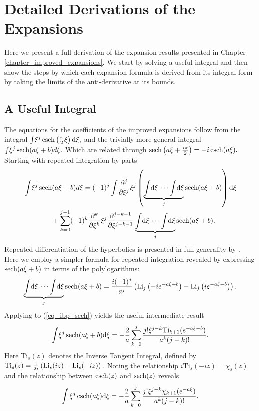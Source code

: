\section{Detailed Derivations of the Expansions}
\label{appendix_expansions_detail}
Here we present a full derivation of the expansion results
presented in Chapter
\ref{chapter_improved_expansions}.  We start by solving a useful
integral and then show the steps by which each expansion formula
is derived from its integral form by taking the limits of the
anti-derivative at its bounds.

\subsection{A Useful Integral}
The equations
for the coefficients of the improved
expansions follow from the integral
$
\int \!
\xi^j\operatorname{csch}\left(\frac{\pi}{2}\xi\right)
\mathrm{d}\xi,
$
and the trivially more general integral
$
\int \! \xi^j \operatorname{sech}(a \xi + b) d\xi.
$
Which are related through
$
\operatorname{sech}\left(a\xi + \frac{i \pi}{2}\right) = -i \operatorname{csch}(a\xi).
$
Starting with repeated integration by parts
\begin{align}
	\begin{split}
		&\int \! \xi^j \operatorname{sech}(a\xi + b) d\xi =
		(-1)^j \int \! \frac{\partial^j}{\partial \xi^j} \xi^j \left(
		\underbrace{\int \! \mathrm{d\xi} \, \cdots \int \! \mathrm{d\xi}}_{j}
		\operatorname{sech}(a\xi + b) \right) \mathrm{d}\xi \\
		&\quad\quad\quad\quad + \sum_{k=0}^{j-1} (-1)^k \frac{\partial^k}{\partial \xi^k}\xi^{j}
		\frac{\partial^{j-k-1}}{\partial\xi^{j-k-1}}
		\underbrace{\int \! \mathrm{d\xi} \, \cdots \int \! \mathrm{d\xi}}_{j}
		\operatorname{sech}(a\xi + b).
		\label{eq_ibp_sech}
	\end{split}
\end{align}
Repeated differentiation of the hyperbolics is presented
in full generality by \cite{qureshi_successive_2019}.  Here we
employ a simpler formula for repeated integration revealed by
expressing $\operatorname{sech}(a\xi + b)$ in terms of the polylogarithms:
\begin{align}
	\underbrace{\int \! \mathrm{d\xi} \, \cdots \int \! \mathrm{d\xi}}_{j}
	\operatorname{sech}(a\xi + b) =
	\frac{i (-1)^j}{a^j}\left(
	\operatorname{Li}_j\left(-i e^{-a\xi + b}\right)
	- \operatorname{Li}_j\left(i e^{-a\xi - b}\right)
	\right).
\end{align}
Applying to (\ref{eq_ibp_sech}) yields
the useful intermediate result
\begin{align}
	\int \! \xi^j \operatorname{sech}(a\xi + b) \mathrm{d}\xi =
	-\frac{2}{a} \sum_{k=0}^j \frac{j! \xi^{j-k}
		\mathrm{Ti}_{k+1}(e^{-a\xi -b})}{a^k (j-k)!}.
\end{align}
Here $\mathrm{Ti}_s(z)$ denotes the Inverse Tangent Integral, defined by
\mbox{$
	\mathrm{Ti}_s(z) = 
	\frac{1}{2i}
	\left( \operatorname{Li}_s(i z) - \operatorname{Li}_s(-i z) \right).
	$}  Noting the relationship
\mbox{$i\mathrm{Ti}_s(-iz) = \chi_s(z)$} and the relationship
between $\operatorname{csch}(z)$ and $\operatorname{sech}(z)$ reveals
\begin{align}
	\int \xi^j \operatorname{csch}(a \xi) \mathrm{d} \xi
	= -\frac{2}{a}\sum_{k=0}^{j}
	\frac{j! \xi^{j-k} \chi_{k+1}(e^{-a\xi})}{a^k (j-k)!}.
\end{align}


